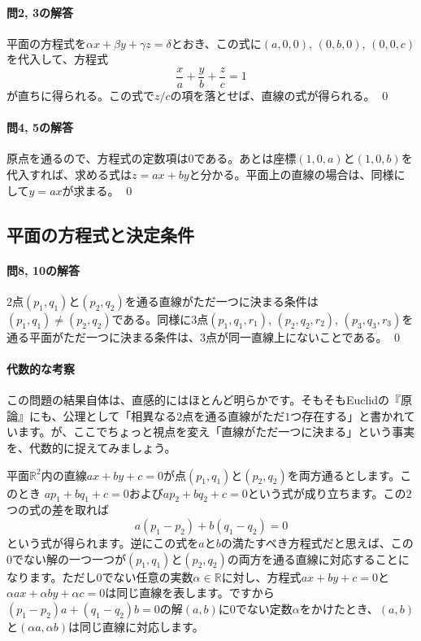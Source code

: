 \paragraph{問2, 3の解答} 平面の方程式を$\alpha x + \beta y + \gamma z = \delta$とおき、この式に$(a,0,0)$, $(0,b,0)$, $(0,0,c)$を代入して、方程式
\[
\frac{x}{a} + \frac{y}{b} + \frac{z}{c} = 1
\]
が直ちに得られる。この式で$z/c$の項を落とせば、直線の式が得られる。 \qed

\paragraph{問4, 5の解答} 原点を通るので、方程式の定数項は$0$である。あとは座標$(1,0,a)$と$(1,0,b)$を代入すれば、求める式は$z = ax + by$と分かる。平面上の直線の場合は、同様にして$y = ax$が求まる。 \qed

\subsection{平面の方程式と決定条件}


\paragraph{問8, 10の解答} $2$点$(p_1,q_1)$と$(p_2,q_2)$を通る直線がただ一つに決まる条件は$(p_1,q_1)\neq(p_2,q_2)$である。同様に$3$点$(p_1,q_1,r_1)$, $(p_2,q_2,r_2)$, $(p_3,q_3,r_3)$を通る平面がただ一つに決まる条件は、$3$点が同一直線上にないことである。 \qed

\paragraph{代数的な考察}
この問題の結果自体は、直感的にはほとんど明らかです。そもそもEuclidの『原論』にも、公理として「相異なる$2$点を通る直線がただ$1$つ存在する」と書かれています。が、ここでちょっと視点を変え「直線がただ一つに決まる」という事実を、代数的に捉えてみましょう。

平面$\mathbb{R}^2$内の直線$ax+by+c=0$が点$(p_1,q_1)$と$(p_2,q_2)$を両方通るとします。このとき
$a p_1 + b q_1 + c =0$および$a p_2 + b q_2 + c  = 0$という式が成り立ちます。この$2$つの式の差を取れば
\[
a(p_1-p_2) + b(q_1-q_2) = 0
\]
という式が得られます。逆にこの式を$a$と$b$の満たすべき方程式だと思えば、この$0$でない解の一つ一つが$(p_1,q_1)$と$(p_2,q_2)$の両方を通る直線に対応することになります。ただし$0$でない任意の実数$\alpha\in\mathbb{R}$に対し、方程式$ax+by+c=0$と$\alpha ax + \alpha by + \alpha c=0$は同じ直線を表します。ですから$(p_1-p_2) a + (q_1-q_2) b = 0$の解$(a,b)$に$0$でない定数$\alpha$をかけたとき、$(a,b)$と$(\alpha a,\alpha b)$は同じ直線に対応します。

